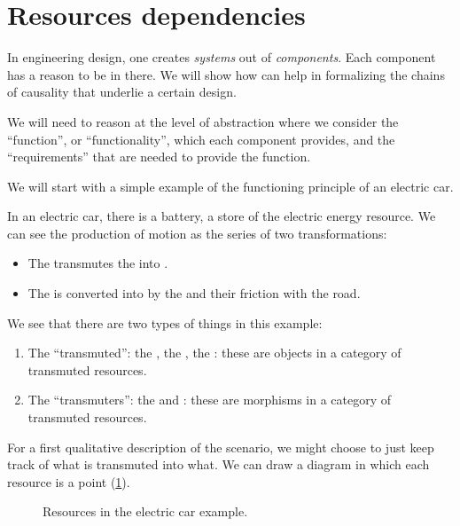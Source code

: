 
\section{Resources dependencies}
\label{sec:dependencies-design}

In engineering design, one creates \emph{systems} out of \emph{components}.
Each component has a reason to be in there.
We will show how  can help in formalizing the chai{}ns of causality that underlie a certain design.

We will need to reason at the level of abstraction where we consider the ``function'', or ``functionality'', which each component provides, and the ``requirements'' that are needed to provide the function.

We will start with a simple example of the functioning principle of an electric car.

In an electric car, there is a battery, a store of the electric energy resource.
We can see the production of motion as the series of two transformations:

\begin{itemize}
    \item The \motor transmutes the \electricpower into \rotationalmotion.
    \item The \rotationalmotion is converted into \translationalmotion by the \wheels and their friction with the road.
\end{itemize}

We see that there are two types of things in this example:
\begin{enumerate}
    \item The ``transmuted'': the \electricpower, the \rotationalmotion, the \translationalmotion: these are objects in a category of transmuted resources.
    \item The ``transmuters'': the \motor and \wheels: these are morphisms in a category of transmuted resources.
\end{enumerate}

For a first qualitative description of the scenario, we might choose to just keep track of what is transmuted into what.
We can draw a diagram in which each resource is a point (\cref{fig:e1}).

\begin{figure}[h!]
    \centering
    \caption{Resources in the electric car example.}
    \label{fig:e1}
\end{figure}

